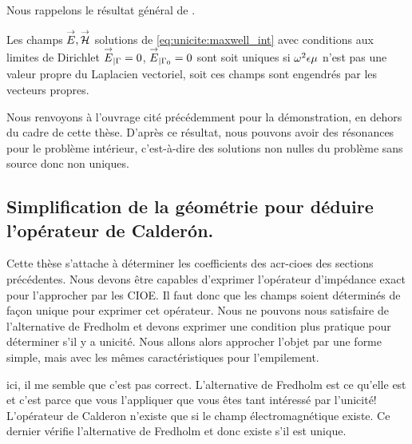     Nous rappelons le résultat général de \cite[Théorème~8, p.~111]{cessenat_mathematical_1996}.
    \begin{thm}
      Les champs \({\overset{\rightarrow}{E}},{\overset{\rightarrow}{\mathcal{H}}}\) solutions de \eqref{eq:unicite:maxwell_int} avec conditions aux limites de Dirichlet \({\overset{\rightarrow}{E}}_{|\Gamma} = 0\), \({\overset{\rightarrow}{E}}_{|\Gamma_0} = 0\) sont soit uniques si \(\omega^2\epsilon\mu\) n'est pas une valeur propre du Laplacien vectoriel, soit ces champs sont engendrés par les vecteurs propres.
    \end{thm}
    Nous renvoyons à l'ouvrage cité précédemment pour la démonstration, en dehors du cadre de cette thèse.
    D'après ce résultat, nous pouvons avoir des résonances pour le problème intérieur, c'est-à-dire des solutions non nulles du problème sans source donc non uniques.


  \subsection{Simplification de la géométrie  pour déduire l'opérateur de Calderón.}
    Cette thèse s'attache à déterminer les coefficients des \glspl{acr-cioe} des sections précédentes.
    Nous devons être capables d'exprimer l'opérateur d'impédance exact pour l'approcher par les CIOE.
    Il faut donc que les champs soient déterminés de façon unique pour exprimer cet opérateur.
    Nous ne pouvons nous satisfaire de l'alternative de Fredholm et devons exprimer une condition plus pratique pour déterminer s'il y a unicité.
    Nous allons alors approcher l'objet par une forme simple, mais avec les mêmes caractéristiques pour l'empilement.
    \begin{REM}
  ici, il me semble que c'est pas correct. L'alternative de Fredholm est ce qu'elle est et c'est parce que vous l’appliquer que vous êtes tant intéressé par l'unicité! 
L'opérateur de Calderon n'existe que si le champ électromagnétique existe.
Ce dernier vérifie l'alternative de Fredholm et donc existe s'il est unique. 
\end{REM}


